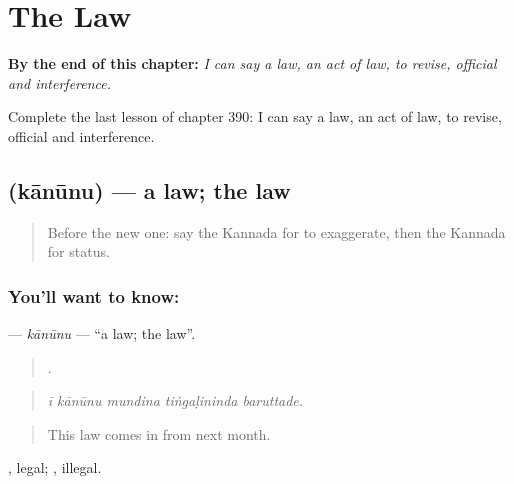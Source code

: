 
\chapter{The Law}
\label{ch:ka-the-law}

\begin{chapteropening}
\textbf{By the end of this chapter:} \emph{I can say a law, an act of law, to revise, official and interference.}

Complete the last lesson of chapter 390: I can say a law, an act of law, to revise, official and interference.
\end{chapteropening}

\section[\texorpdfstring{\kn{ಕಾನೂನು} (kānūnu)}{ಕಾನೂನು (kānūnu)}]{ (kānūnu) — a law; the law}

\label{lesson:KA-C390-kanunu}



\begin{quote}
Before the new one: say the Kannada for to exaggerate, then the Kannada for status.
\end{quote}

\subsection*{You'll want to know: }
\textbf{} — \emph{kānūnu} — \textquotedblleft{}a law; the law\textquotedblright{}.

\begin{quote}
    .
\end{quote}

\begin{quote}
\emph{ī kānūnu mundina tiṅgaḷininda baruttade.}
\end{quote}

\begin{quote}
This law comes in from next month.
\end{quote}

, legal; , illegal.

